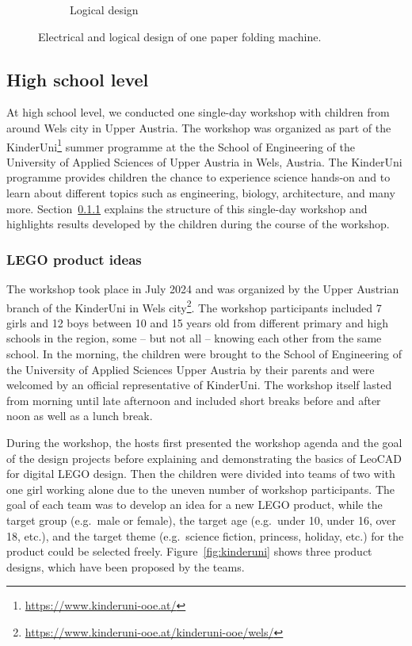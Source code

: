 \documentclass{PDS}
\begin{document}
\begin{figure}[htbp]
\begin{subfigure}[b]{0.45\textwidth}
        \caption{Logical design}
        \label{fig:paper-sub-2}
    \end{subfigure}
    \caption{Electrical and logical design of one paper folding machine.}
    \label{fig:paper-sub}
\end{figure}

\subsection{High school level}
\label{sec:school}

At high school level, we conducted one single-day workshop with children from around Wels city in Upper Austria.
The workshop was organized as part of the KinderUni\footnote{\url{https://www.kinderuni-ooe.at/}} summer programme at the the School of Engineering of the University of Applied Sciences of Upper Austria in Wels, Austria.
The KinderUni programme provides children the chance to experience science hands-on and to learn about different topics such as engineering, biology, architecture, and many more.
Section~\ref{sec:school-lego} explains the structure of this single-day workshop and highlights results developed by the children during the course of the workshop.

\subsubsection{LEGO product ideas}
\label{sec:school-lego}

The workshop took place in July 2024 and was organized by the Upper Austrian branch of the KinderUni in Wels city\footnote{\url{https://www.kinderuni-ooe.at/kinderuni-ooe/wels/}}.
The workshop participants included 7 girls and 12 boys between 10 and 15 years old from different primary and high schools in the region, some -- but not all -- knowing each other from the same school.
In the morning, the children were brought to the School of Engineering of the University of Applied Sciences Upper Austria by their parents and were welcomed by an official representative of KinderUni.
The workshop itself lasted from morning until late afternoon and included short breaks before and after noon as well as a lunch break.

During the workshop, the hosts first presented the workshop agenda and the goal of the design projects before explaining and demonstrating the basics of LeoCAD for digital LEGO design.
Then the children were divided into teams of two with one girl working alone due to the uneven number of workshop participants.
The goal of each team was to develop an idea for a new LEGO product, while the target group (e.g.\ male or female), the target age (e.g.\ under 10, under 16, over 18, etc.), and the target theme (e.g.\ science fiction, princess, holiday, etc.) for the product could be selected freely.
Figure~\ref{fig:kinderuni} shows three product designs, which have been proposed by the teams.
\end{document}
